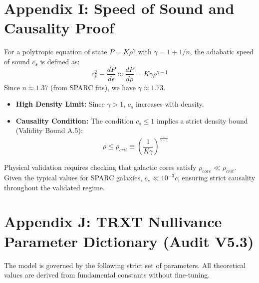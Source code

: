 \documentclass[a4paper,12pt]{article}
\begin{document}
\section{Appendix I: Speed of Sound and Causality Proof}

For a polytropic equation of state $P = K \rho^\gamma$ with $\gamma = 1 + 1/n$, the adiabatic speed of sound $c_s$ is defined as:
\begin{equation}
    c_s^2 \equiv \frac{dP}{d\epsilon} \approx \frac{dP}{d\rho} = K \gamma \rho^{\gamma-1}
\end{equation}
Since $n \approx 1.37$ (from SPARC fits), we have $\gamma \approx 1.73$.
\begin{itemize}
    \item \textbf{High Density Limit:} Since $\gamma > 1$, $c_s$ increases with density.
    \item \textbf{Causality Condition:} The condition $c_s \le 1$ implies a strict density bound (Validity Bound A.5):
    \begin{equation}
        \rho \le \rho_{crit} \equiv \left( \frac{1}{K \gamma} \right)^{\frac{1}{\gamma-1}}
    \end{equation}
\end{itemize}
Physical validation requires checking that galactic cores satisfy $\rho_{core} \ll \rho_{crit}$. Given the typical values for SPARC galaxies, $c_s \ll 10^{-3} c$, ensuring strict causality throughout the validated regime.

\section{Appendix J: TRXT Nullivance Parameter Dictionary (Audit V5.3)}

The model is governed by the following strict set of parameters. All theoretical values are derived from fundamental constants without fine-tuning.
\end{document}
